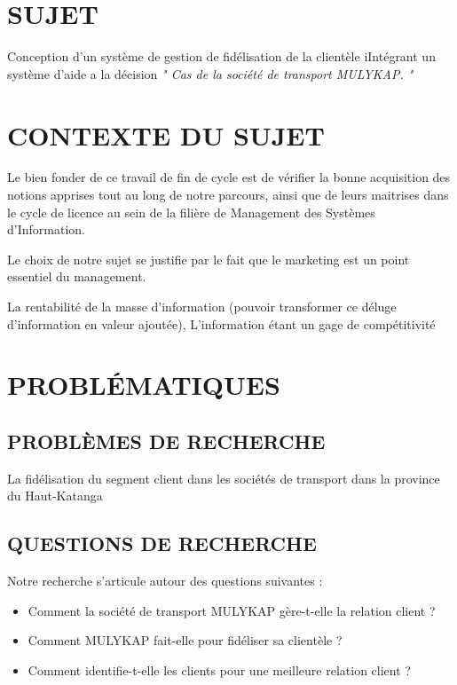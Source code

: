 \documentclass[a4paper,12pt]{article}
\begin{document}
\section[Sujet]{SUJET}
\begin{center}
    Conception d’un système de gestion de fidélisation
    de la clientèle
    iIntégrant un système d’aide a la décision 
    \textit{" Cas de la société de transport MULYKAP. "}        
\end{center}

\section[Context du sujet]{CONTEXTE DU SUJET}
Le bien fonder de ce travail de fin de cycle est de
vérifier la bonne acquisition des notions apprises tout
au long de notre parcours, ainsi que de leurs maitrises
dans le cycle de licence au sein de la filière de Management
des Systèmes d’Information.

\par Le choix de notre sujet se justifie par le fait que le marketing 
est un point essentiel du management.
\par La rentabilité de la masse d’information (pouvoir transformer
ce déluge d’information en valeur ajoutée), L’information étant
un gage de compétitivité %
\section[Problématique]{PROBLÉMATIQUES}
\subsection[Problèmes de recherche]{PROBLÈMES DE RECHERCHE}
La fidélisation du segment client dans les sociétés de transport
dans la province du Haut-Katanga 
\subsection[Questions de recherche]{QUESTIONS DE RECHERCHE}
Notre recherche s’articule autour des questions suivantes : 
\begin{itemize}
    \item Comment la société de transport MULYKAP gère-t-elle
    la relation client ?
    \item Comment MULYKAP fait-elle pour fidéliser sa clientèle ?
    \item Comment identifie-t-elle les clients pour une
    meilleure relation client ?
\end{itemize}
\end{document}
